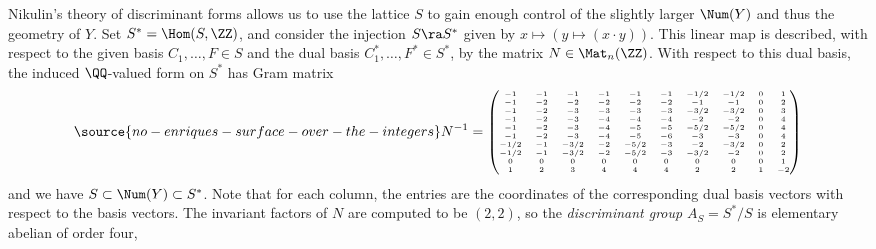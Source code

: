 Nikulin's theory of discriminant forms \cite{Nikulin-1980} allows us to use the lattice $S$ to gain enough control of the slightly larger  $\Num(Y)$
and thus the geometry of  $Y$.
Set $S^*=\Hom(S,\ZZ)$, and consider the   injection $ S\ra S^*$ given by $x\mapsto (y\mapsto (x\cdot y))$.
This linear map is described, with respect to the given basis $C_1,\ldots,F\in S$ and the   dual basis $C_1^*,\ldots,F^*\in S^*$,
by the matrix    $N\in\Mat_n(\ZZ)$.
With respect to this dual basis, the  induced $\QQ$-valued form   on $S^*$ has Gram matrix
\begin{equation}
\label{gram matrix}
\source{no-enriques-surface-over-the-integers}
N^{-1}=
{\tiny
\begin{pmatrix}
  -1   &-1   &-1   &-1   &-1   &-1 &-1/2 &-1/2   & 0   & 1\\
  -1   &-2   &-2   &-2   &-2   &-2  & -1 &  -1   & 0   & 2\\
  -1   &-2   &-3   &-3   &-3   &-3 &-3/2 &-3/2   & 0   & 3\\
  -1   &-2   &-3   &-4  & -4   &-4 &  -2 &  -2   & 0   & 4\\
  -1   &-2   &-3   &-4   &-5   &-5 &-5/2 &-5/2   & 0   & 4\\
  -1   &-2   &-3   &-4   &-5   &-6 &  -3 &  -3   & 0   & 4\\
-1/2   &-1 &-3/2   &-2 &-5/2   &-3 &  -2 &-3/2   & 0   & 2\\
-1/2   &-1 &-3/2   &-2 &-5/2   &-3 &-3/2 &  -2   & 0   & 2\\
   0   & 0   & 0   & 0  &  0   & 0 &   0 &   0   & 0   & 1\\
   1   & 2   & 3   & 4  & 4    &4  &  2  &  2    & 1   &-2
\end{pmatrix}
}
\end{equation}
and we have $S\subset\Num(Y)\subset S^*$.  Note that for each  column, the entries are the coordinates of the corresponding
dual basis vectors with respect to the basis vectors.
%
%
The  invariant factors  of $N$ are  computed to be $(2,2)$, so the \emph{discriminant group} $A_S=S^*/S$ is elementary abelian of order four,
